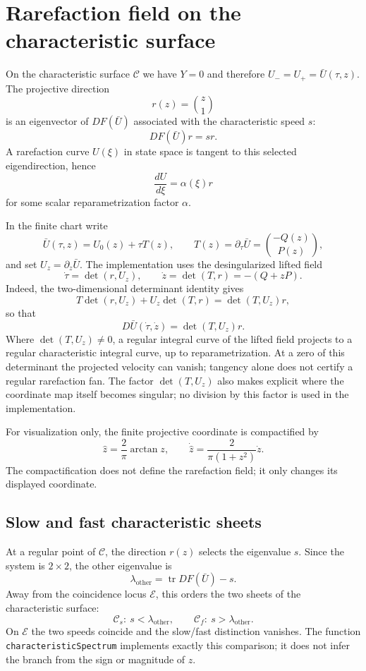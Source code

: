 \section{Rarefaction field on the characteristic surface}

On the characteristic surface $\mathcal C$ we have $Y=0$ and therefore
$U_-=U_+=\bar U(\tau,z)$.  The projective direction
\[
r(z)=\binom{z}{1}
\]
is an eigenvector of $DF(\bar U)$ associated with the characteristic speed
$s$:
\[
DF(\bar U)r=s r.
\]
A rarefaction curve $U(\xi)$ in state space is tangent to this selected
eigendirection, hence
\[
\frac{dU}{d\xi}=\alpha(\xi)r
\]
for some scalar reparametrization factor $\alpha$.

In the finite chart write
\[
\bar U(\tau,z)=U_0(z)+\tau T(z),
\qquad
T(z)=\partial_\tau\bar U=\binom{-Q(z)}{P(z)},
\]
and set $U_z=\partial_z\bar U$.  The implementation uses the
desingularized lifted field
\[
\boxed{
\dot\tau=\det(r,U_z),
\qquad
\dot z=\det(T,r)=-(Q+zP).
}
\]
Indeed, the two-dimensional determinant identity gives
\[
T\det(r,U_z)+U_z\det(T,r)=\det(T,U_z)r,
\]
so that
\[
\boxed{
D\bar U(\dot\tau,\dot z)=\det(T,U_z)r.
}
\]
Where $\det(T,U_z)\ne0$, a regular integral curve of the lifted field projects
to a regular characteristic integral curve, up to reparametrization. At a zero
of this determinant the projected velocity can vanish; tangency alone does not
certify a regular rarefaction fan. The factor
$\det(T,U_z)$ also makes explicit where the coordinate map itself becomes
singular; no division by this factor is used in the implementation.

For visualization only, the finite projective coordinate is compactified by
\[
\hat z=\frac{2}{\pi}\arctan z,
\qquad
\boxed{
\dot{\hat z}=\frac{2}{\pi(1+z^2)}\dot z.
}
\]
The compactification does not define the rarefaction field; it only changes
its displayed coordinate.

\subsection{Slow and fast characteristic sheets}

At a regular point of $\mathcal C$, the direction $r(z)$ selects the
eigenvalue $s$.  Since the system is $2\times2$, the other eigenvalue is
\[
\lambda_{\mathrm{other}}=\operatorname{tr}DF(\bar U)-s.
\]
Away from the coincidence locus $\mathcal E$, this orders the two sheets of
the characteristic surface:
\[
\boxed{
\mathcal C_s:\ s<\lambda_{\mathrm{other}},
\qquad
\mathcal C_f:\ s>\lambda_{\mathrm{other}}.
}
\]
On $\mathcal E$ the two speeds coincide and the slow/fast distinction
vanishes.  The function \texttt{characteristicSpectrum} implements exactly
this comparison; it does not infer the branch from the sign or magnitude of
$z$.

